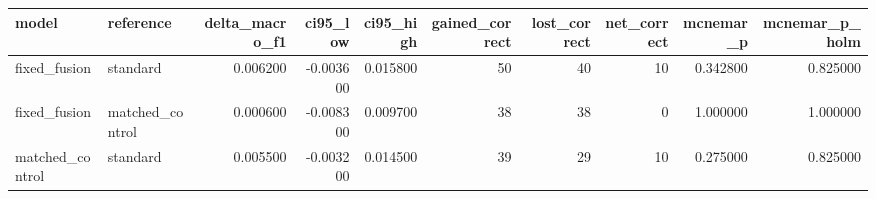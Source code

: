 \begin{tabular}{llrrrrrrrr}
\toprule
model & reference & delta\_macro\_f1 & ci95\_low & ci95\_high & gained\_correct & lost\_correct & net\_correct & mcnemar\_p & mcnemar\_p\_holm \\
\midrule
fixed\_fusion & standard & 0.006200 & -0.003600 & 0.015800 & 50 & 40 & 10 & 0.342800 & 0.825000 \\
fixed\_fusion & matched\_control & 0.000600 & -0.008300 & 0.009700 & 38 & 38 & 0 & 1.000000 & 1.000000 \\
matched\_control & standard & 0.005500 & -0.003200 & 0.014500 & 39 & 29 & 10 & 0.275000 & 0.825000 \\
\bottomrule
\end{tabular}
